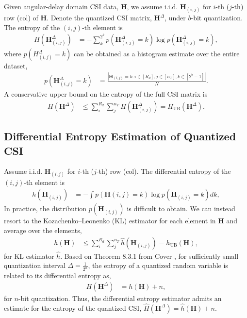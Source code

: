 Given angular-delay domain CSI data, $\mathbf H$, we assume i.i.d. $\mathbf H_{(i,j)}$ for $i$-th ($j$-th) row (col) of $\mathbf H$.
Denote the quantized CSI matrix, $\mathbf H^\Delta$, under $b$-bit quantization. The entropy of the $(i,j)$-th element is
\begin{align*}
H(\mathbf H^\Delta_{(i,j)}) &= - \sum_{k}^{2^b} p(\mathbf H^\Delta_{(i,j)} = k) \log p(\mathbf H^\Delta_{(i,j)} = k),
\end{align*}
where $p(H^\Delta_{(i,j)} = k)$ can be obtained as a histogram estimate over the entire dataset,
\begin{align*}
	p(\mathbf H^\Delta_{(i,j)} = k) &= \frac{|\mathbf H_{(i,j)}=k:i\in[R_d],j\in[n_T],k\in[2^b-1]|}{N}.
\end{align*}
A conservative upper bound on the entropy of the full CSI matrix is
\begin{align}
H(\mathbf H^\Delta) &\leq \sum_{i}^{R_d}\sum_{j}^{n_T} H(\mathbf H^\Delta_{(i,j)}) = H_{\text{UB}}(\mathbf H^\Delta). \label{eq:csi-ent}
\end{align}

\subsection{Differential Entropy Estimation of Quantized CSI} \label{sec:diffent_est_quant}

Assume i.i.d. $\mathbf H_{(i,j)}$ for $i$-th ($j$-th) row (col). The differential entropy of the $(i,j)$-th element is
\begin{align*}
	h(\mathbf H_{(i,j)}) &= - \int p(\mathbf H{(i,j)} = k) \log p(\mathbf H_{(i,j)} = k) dk,
\end{align*}
In practice, the distribution $p(\mathbf H_{(i,j)})$ is difficult to obtain. We can instead resort to the Kozachenko–Leonenko (KL) estimator \cite{ref:Kozachenko1987SampleEstimate} for each element in $\mathbf H$ and average over the elements,
\begin{align}
	h(\mathbf H) &\leq \sum_{i}^{R_d}\sum_{j}^{n_T} \hat h(\mathbf H_{(i,j)}) = h_{\text{UB}}(\mathbf H), \label{eq:csi-diff-ent}
\end{align}
for KL estimator $\hat h$. Based on Theorem 8.3.1 from Cover \cite{ref:Cover1999Elements}, for sufficiently small quantization interval $\Delta = \frac {1}{2^n}$, the entropy of a quantized random variable is related to its differential entropy as,
\begin{align}
  H(\mathbf H^{\Delta}) &= h(\mathbf H) + n, \label{eq:cover-thm}
\end{align}
for $n$-bit quantization. Thus, the differential entropy estimator admits an estimate for the entropy of the quantized CSI, $\hat H({\mathbf H}^\Delta) = \hat h(\mathbf H) + n$.

